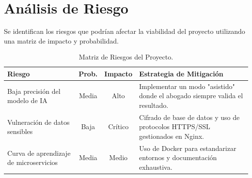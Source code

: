 \section{Análisis de Riesgo}
Se identifican los riesgos que podrían afectar la viabilidad del proyecto utilizando una matriz de impacto y probabilidad.

\begin{table}[htbp]
\centering
\small
\begin{tabular}{|p{3cm}|c|c|p{6cm}|}
\hline
\textbf{Riesgo} & \textbf{Prob.} & \textbf{Impacto} & \textbf{Estrategia de Mitigación} \\ \hline
Baja precisión del modelo de IA & Media & Alto & Implementar un modo "asistido" donde el abogado siempre valida el resultado. \\ \hline
Vulneración de datos sensibles & Baja & Crítico & Cifrado de base de datos y uso de protocolos HTTPS/SSL gestionados en Nginx. \\ \hline
Curva de aprendizaje de microservicios & Media & Medio & Uso de Docker para estandarizar entornos y documentación exhaustiva. \\ \hline
\end{tabular}
\caption{Matriz de Riesgos del Proyecto.}
\end{table}